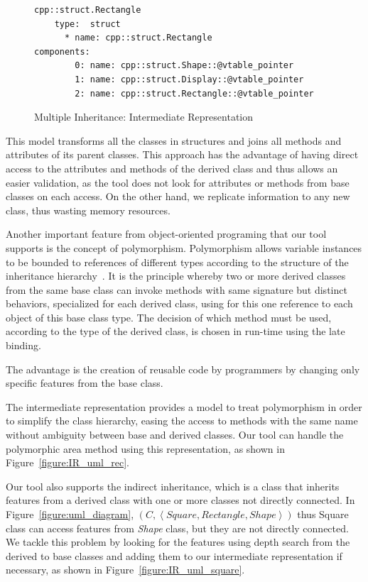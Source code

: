 \documentclass[a4paper]{llncs}
\begin{document}
\begin{figure}[h]
\centering
\begin{minipage}{0.9\textwidth}
\begin{lstlisting}[style=nonumbers]
cpp::struct.Rectangle
    type:  struct
      * name: cpp::struct.Rectangle
components:
        0: name: cpp::struct.Shape::@vtable_pointer
        1: name: cpp::struct.Display::@vtable_pointer
        2: name: cpp::struct.Rectangle::@vtable_pointer
\end{lstlisting}
\end{minipage}
\caption{Multiple Inheritance: Intermediate Representation}
\label{figure:multiple-inheritance-IR}
\end{figure}

This model transforms all the classes in structures and joins all
methods and attributes of its parent classes. This approach has
the advantage of having direct access to the attributes and methods
of the derived class and thus allows an easier validation, as the tool
does not look for attributes or methods from base classes on each access.
On the other hand, we replicate information to any new class, thus wasting
memory resources.

Another important feature from object-oriented programing that our tool
supports is the concept of polymorphism. Polymorphism allows variable instances to be
bounded to references of different types according to the structure of the
inheritance hierarchy~\cite{Alexander02}.
It is the principle whereby two or more derived classes from the same base
class can invoke methods with same signature but distinct behaviors, specialized
for each derived class, using for this one reference to each object of this base class type.
The decision of which method must be used, according to the type of the
derived class, is chosen in run-time using the late binding.

The advantage is the creation of reusable code by programmers by changing only
specific features from the base class.

The intermediate representation provides a model to treat polymorphism in
order to simplify the class hierarchy,
easing the access to methods with the same name without ambiguity between
base and derived classes.
Our tool can handle the polymorphic area method using this representation,
as shown in Figure~\ref{figure:IR_uml_rec}.

Our tool also supports the indirect inheritance, which is a class that
inherits features from a derived class with one or more classes
not directly connected. In Figure~\ref{figure:uml_diagram}, \linebreak
$\left(C, \left\langle Square, Rectangle, Shape \right\rangle \right)$
thus Square class can access features from \textit{Shape} class,
but they are not directly connected. We tackle this problem by
looking for the features using depth search from the derived to base classes
and adding them to our intermediate representation if necessary,
as shown in Figure~\ref{figure:IR_uml_square}.
\end{document}
